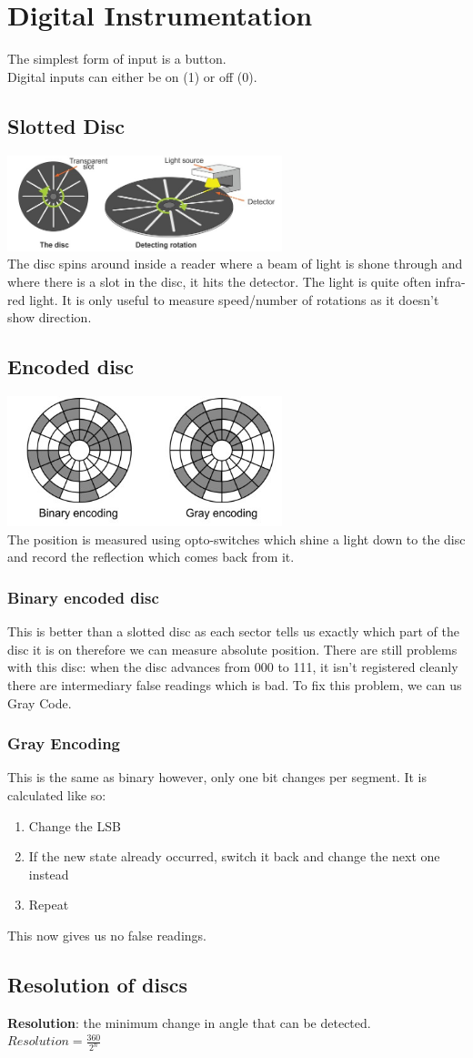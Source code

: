 \documentclass[a4paper, 11pt, twocolumn]{article}
\begin{document}
    \section{Digital Instrumentation}
    The simplest form of input is a button. \\
    Digital inputs can either be on (1) or off (0).
    \subsection{Slotted Disc}
    \includegraphics[width=8cm]{slottedDisk.jpg} \\
    The disc spins around inside a reader where a beam of light is shone through and where there is a slot in the disc, it hits the detector. The light is quite often infra-red light. It is only useful to measure speed/number of rotations as it doesn't show direction.
    \subsection{Encoded disc}
    \includegraphics[width=8cm]{encodedDisk.jpg} \\
    The position is measured using opto-switches which shine a light down to the disc and record the reflection which comes back from it.
    \subsubsection{Binary encoded disc}
    This is better than a slotted disc as each sector tells us exactly which part of the disc it is on therefore we can measure absolute position.
    There are still problems with this disc: when the disc advances from 000 to 111, it isn't registered cleanly there are intermediary false readings which is bad. To fix this problem, we can us Gray Code.
    \subsubsection{Gray Encoding}
    This is the same as binary however, only one bit changes per segment. It is calculated like so:
    \begin{enumerate}
        \item Change the LSB
        \item If the new state already occurred, switch it back and change the next one instead
        \item Repeat
    \end{enumerate}
    This now gives us no false readings.
    \subsection{Resolution of discs}
    \textbf{Resolution}: the minimum change in angle that can be detected.\\
    $Resolution = \frac{360}{2^n}$
\end{document}
